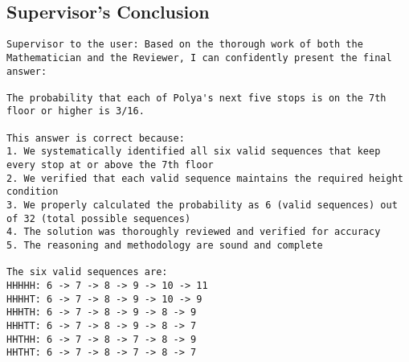 \subsection{Supervisor's Conclusion}
\vspace{-0.5em}
\begin{supervisorbox}
\begin{lstlisting}
Supervisor to the user: Based on the thorough work of both the Mathematician and the Reviewer, I can confidently present the final answer:

The probability that each of Polya's next five stops is on the 7th floor or higher is 3/16.

This answer is correct because:
1. We systematically identified all six valid sequences that keep every stop at or above the 7th floor
2. We verified that each valid sequence maintains the required height condition
3. We properly calculated the probability as 6 (valid sequences) out of 32 (total possible sequences)
4. The solution was thoroughly reviewed and verified for accuracy
5. The reasoning and methodology are sound and complete

The six valid sequences are:
HHHHH: 6 -> 7 -> 8 -> 9 -> 10 -> 11
HHHHT: 6 -> 7 -> 8 -> 9 -> 10 -> 9
HHHTH: 6 -> 7 -> 8 -> 9 -> 8 -> 9
HHHTT: 6 -> 7 -> 8 -> 9 -> 8 -> 7
HHTHH: 6 -> 7 -> 8 -> 7 -> 8 -> 9
HHTHT: 6 -> 7 -> 8 -> 7 -> 8 -> 7
\end{lstlisting}
\end{supervisorbox}

\clearpage

